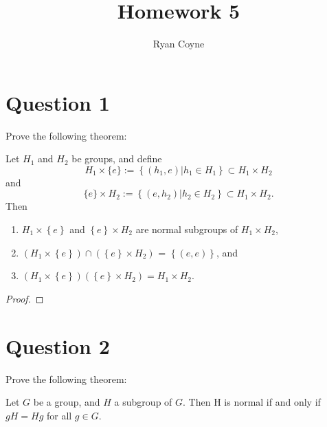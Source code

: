 \documentclass[12pt]{article}
\title{Homework 5}
\author{Ryan Coyne}
\begin{document}
\maketitle

\section{Question 1}
Prove the following theorem:
\begin{theorem}
    Let \(H_1\) and \(H_2\) be groups, and define
    \begin{equation*}
        H_1 \times \{e\} := \left\{ (h_1, e) | h_1\in H_1 \right\} \subset H_1 \times H_2
    \end{equation*}
    and
    \begin{equation*}
       \{e\} \times H_2 := \left\{ (e, h_2) | h_2\in H_2 \right\} \subset H_1 \times H_2.
    \end{equation*}
    Then
    \begin{enumerate}[label=\alph*)]
        \item \(H_1\times \left\{ e \right\}\) and \(\left\{ e \right\} \times H_2\) are normal subgroups of \(H_1 \times H_2\),
        \item \((H_1\times \left\{ e \right\}) \cap (\left\{ e \right\}\times H_2)\) = \(\left\{ (e,e) \right\}\), and
        \item \((H_1\times\left\{ e \right\})(\left\{ e \right\}\times H_2) = H_1 \times H_2\).
    \end{enumerate}
\end{theorem}
\begin{proof}
    
\end{proof}
    
\section{Question 2}
Prove the following theorem:
\begin{theorem}
    Let \(G\) be a group, and \(H\) a subgroup of \(G\). Then H is normal if and only if \(gH = Hg\) for all \(g \in G\).
\end{theorem}
\end{document}
